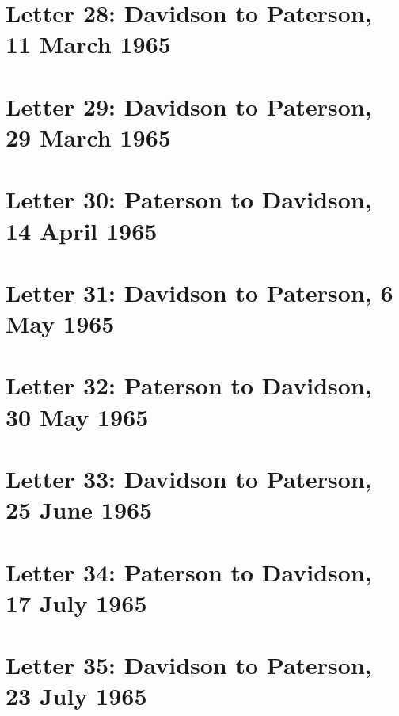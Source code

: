 \documentclass[a4paper,11pt,abstracton,hidelinks]{scrartcl}
\begin{document}
\section{Letter 28: Davidson to Paterson, 11 March 1965}


\section{Letter 29: Davidson to Paterson, 29 March 1965}


\section{Letter 30: Paterson to Davidson, 14 April 1965}


\section{Letter 31: Davidson to Paterson, 6 May 1965}


\section{Letter 32: Paterson to Davidson, 30 May 1965}


\section{Letter 33: Davidson to Paterson, 25 June 1965}


\section{Letter 34: Paterson to Davidson, 17 July 1965}


\section{Letter 35: Davidson to Paterson, 23 July 1965}

\end{document}

